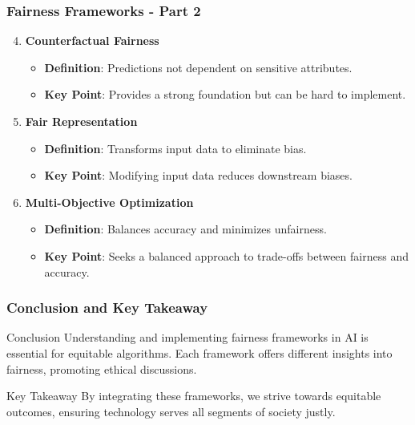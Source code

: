 \documentclass[aspectratio=169]{beamer}
\begin{document}
\begin{frame}[fragile]
    \frametitle{Fairness Frameworks - Part 2}
    \begin{enumerate}
        \setcounter{enumi}{3}
        \item \textbf{Counterfactual Fairness}
            \begin{itemize}
                \item \textbf{Definition}: Predictions not dependent on sensitive attributes.
                \item \textbf{Key Point}: Provides a strong foundation but can be hard to implement.
            \end{itemize}
        
        \item \textbf{Fair Representation}
            \begin{itemize}
                \item \textbf{Definition}: Transforms input data to eliminate bias.
                \item \textbf{Key Point}: Modifying input data reduces downstream biases.
            \end{itemize}
        
        \item \textbf{Multi-Objective Optimization}
            \begin{itemize}
                \item \textbf{Definition}: Balances accuracy and minimizes unfairness.
                \item \textbf{Key Point}: Seeks a balanced approach to trade-offs between fairness and accuracy.
            \end{itemize}
    \end{enumerate}
\end{frame}

\begin{frame}[fragile]
    \frametitle{Conclusion and Key Takeaway}
    \begin{block}{Conclusion}
        Understanding and implementing fairness frameworks in AI is essential for equitable algorithms. Each framework offers different insights into fairness, promoting ethical discussions.
    \end{block}
    
    \begin{block}{Key Takeaway}
        By integrating these frameworks, we strive towards equitable outcomes, ensuring technology serves all segments of society justly.
    \end{block}
\end{frame}
\end{document}
